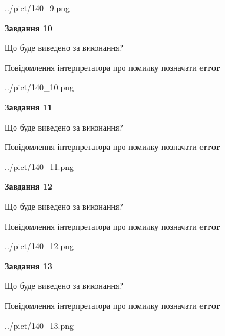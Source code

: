 \documentclass[11pt, ukrainian]{article}
\begin{document}
{\begin {large}
\begin{center}
	{../pict/140_9.png}
\end{center}
\newpage

{\begin {center}\textbf{Завдання 10}\end {center}}\par
Що буде виведено за виконання? \par
Повідомлення інтерпретатора про помилку позначати \textbf{error}

\begin{center}
	{../pict/140_10.png}
\end{center}
\newpage

{\begin {center}\textbf{Завдання 11}\end {center}}\par
Що буде виведено за виконання? \par
Повідомлення інтерпретатора про помилку позначати \textbf{error}

\begin{center}
	{../pict/140_11.png}
\end{center}
\newpage

{\begin {center}\textbf{Завдання 12}\end {center}}\par
Що буде виведено за виконання? \par
Повідомлення інтерпретатора про помилку позначати \textbf{error}

\begin{center}
	{../pict/140_12.png}
\end{center}
\newpage

{\begin {center}\textbf{Завдання 13}\end {center}}\par
Що буде виведено за виконання? \par
Повідомлення інтерпретатора про помилку позначати \textbf{error}

\begin{center}
	{../pict/140_13.png}
\end{center}
\newpage


\end{large}}
\end{document}
